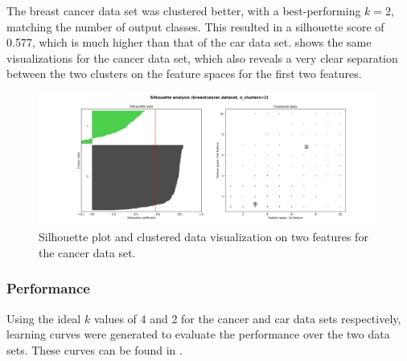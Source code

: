 \documentclass{article}
\begin{document}
        The breast cancer data set was clustered better, with a best-performing $k=2$, matching the number of output classes. This resulted in a silhouette score of 0.577, which is much higher than that of the car data set.  shows the same visualizations for the cancer data set, which also reveals a very clear separation between the two clusters on the feature spaces for the first two features.

        \begin{figure}[htb]
        \centering
        \includegraphics[width=\linewidth]{out/kmeans/cancer-2-clusters.png}
        \caption{Silhouette plot and clustered data visualization on two features for the cancer data set.}
        \label{fig:km-silhouette-cancer}
        \end{figure}

      \subsubsection{Performance}
        Using the ideal $k$ values of 4 and 2 for the cancer and car data sets respectively, learning curves were generated to evaluate the performance over the two data sets. These curves can be found in .
\end{document}
